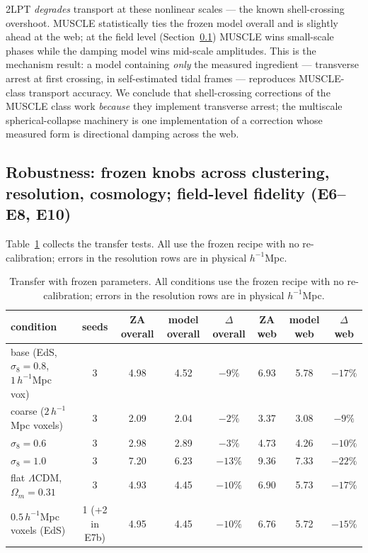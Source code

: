 \documentclass[11pt]{article}
\begin{document}
2LPT \emph{degrades} transport at these nonlinear scales --- the known shell-crossing overshoot. MUSCLE statistically ties the frozen model overall and is slightly ahead at the web; at the field level (Section~\ref{sec:robustness}) MUSCLE wins small-scale phases while the damping model wins mid-scale amplitudes. This is the mechanism result: a model containing \emph{only} the measured ingredient --- transverse arrest at first crossing, in self-estimated tidal frames --- reproduces MUSCLE-class transport accuracy. We conclude that shell-crossing corrections of the MUSCLE class work \emph{because} they implement transverse arrest; the multiscale spherical-collapse machinery is one implementation of a correction whose measured form is directional damping across the web.

\subsection{Robustness: frozen knobs across clustering, resolution, cosmology; field-level fidelity (E6--E8, E10)}
\label{sec:robustness}

Table~\ref{tab:transfer} collects the transfer tests. All use the frozen recipe with no re-calibration; errors in the resolution rows are in physical $h^{-1}$Mpc.

\begin{table}[htbp]
\centering
\caption{Transfer with frozen parameters. All conditions use the frozen recipe with no re-calibration; errors in the resolution rows are in physical $h^{-1}$Mpc.}
\label{tab:transfer}
\small
\begin{tabular}{lccccccc}
\toprule
condition & seeds & ZA overall & model overall & $\Delta$ overall & ZA web & model web & $\Delta$ web \\
\midrule
base (EdS, $\sigma_8 = 0.8$, $1\,h^{-1}$Mpc vox) & 3 & 4.98 & 4.52 & $-9\%$ & 6.93 & 5.78 & $-17\%$ \\
coarse ($2\,h^{-1}$Mpc voxels) & 3 & 2.09 & 2.04 & $-2\%$ & 3.37 & 3.08 & $-9\%$ \\
$\sigma_8 = 0.6$ & 3 & 2.98 & 2.89 & $-3\%$ & 4.73 & 4.26 & $-10\%$ \\
$\sigma_8 = 1.0$ & 3 & 7.20 & 6.23 & $-13\%$ & 9.36 & 7.33 & $-22\%$ \\
flat $\Lambda$CDM, $\Omega_m = 0.31$ & 3 & 4.93 & 4.45 & $-10\%$ & 6.90 & 5.73 & $-17\%$ \\
$0.5\,h^{-1}$Mpc voxels (EdS) & 1 (+2 in E7b) & 4.95 & 4.45 & $-10\%$ & 6.76 & 5.72 & $-15\%$ \\
\bottomrule
\end{tabular}
\end{table}
\end{document}
